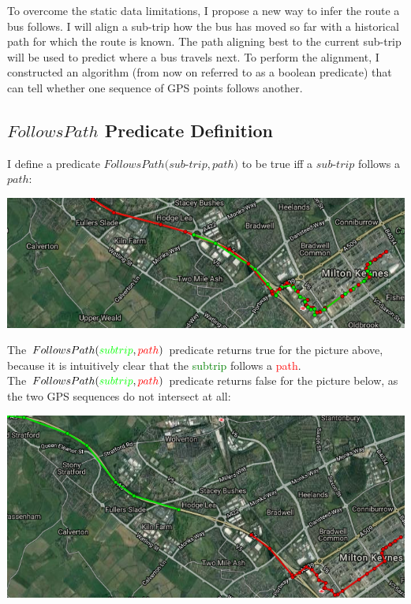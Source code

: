 \documentclass[12pt,a4paper,oneside,openright]{report}
\begin{document}
To overcome the static data limitations, I propose a new way to infer the
route a bus follows. I will align a sub-trip how the bus has moved
so far with a historical path for which the route is known. The path aligning
best to the current sub-trip will be used to predict where a bus travels next.
To perform the alignment, I constructed an algorithm (from now on referred
to as a boolean predicate) that can tell whether one sequence of GPS points 
follows another.

\subsection{$FollowsPath$ Predicate Definition}

I define a predicate $FollowsPath(sub$-$trip, path)$ to be true iff a $sub$-$trip$
follows a $path$:

\includegraphics[width=\textwidth]{figs/follows.png}

The $FollowsPath(\textcolor{green}{subtrip}, \textcolor{red}{path})$ 
predicate returns true for the picture above, because it is intuitively clear that
the \textcolor{green}{subtrip} follows a \textcolor{red}{path}. \\

The $FollowsPath(\textcolor{green}{subtrip}, \textcolor{red}{path})$
predicate returns false for the picture below, as the two GPS sequences do not intersect at all:

\:

\includegraphics[width=\textwidth]{figs/not_follows_path.png}
\end{document}
